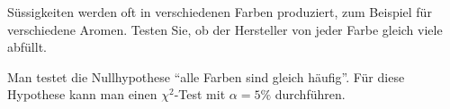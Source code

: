 Süssigkeiten werden oft in verschiedenen Farben produziert, zum Beispiel
für verschiedene Aromen. Testen Sie, ob der Hersteller von jeder Farbe
gleich viele abfüllt.


\begin{loesung}
Man testet die Nullhypothese ``alle Farben sind gleich häufig''. Für
diese Hypothese kann man einen $\chi^2$-Test mit $\alpha=5\%$ durchführen.
\end{loesung}


